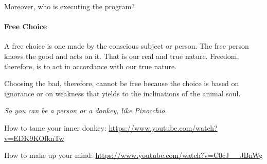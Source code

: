 Moreover, who is executing the program?

\paragraph{Free Choice}


A free choice is one made by the conscious subject or person. The free person knows the good and acts on it. That is our real and true nature. Freedom, therefore, is to act in accordance with our true nature.

Choosing the bad, therefore, cannot be free because the choice is based on ignorance or on weakness that yields to the inclinations of the animal soul.

\emph{So you can be a person or a donkey, like Pinocchio.}

How to tame your inner donkey: \url{https://www.youtube.com/watch?v=EDK9KOfknTw}

How to make up your mind: \url{https://www.youtube.com/watch?v=C0cJ\_\_JBnWg}


